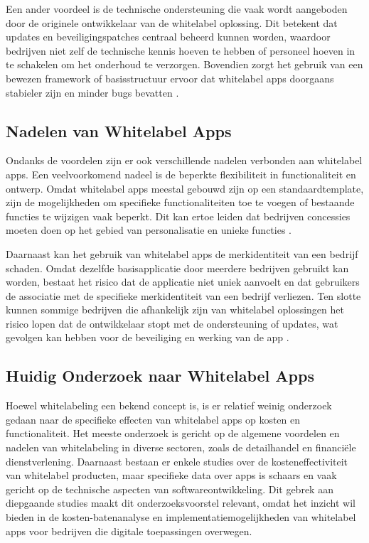 Een ander voordeel is de technische ondersteuning die vaak wordt aangeboden door de originele ontwikkelaar van de whitelabel oplossing. 
Dit betekent dat updates en beveiligingspatches centraal beheerd kunnen worden, waardoor bedrijven niet zelf de technische kennis hoeven te hebben of personeel hoeven in te schakelen om het onderhoud te verzorgen. 
Bovendien zorgt het gebruik van een bewezen framework of basisstructuur ervoor dat whitelabel apps doorgaans stabieler zijn en minder bugs bevatten \autocite{Candelario2024}.

\subsection{Nadelen van Whitelabel Apps}
Ondanks de voordelen zijn er ook verschillende nadelen verbonden aan whitelabel apps. 
Een veelvoorkomend nadeel is de beperkte flexibiliteit in functionaliteit en ontwerp. 
Omdat whitelabel apps meestal gebouwd zijn op een standaardtemplate, zijn de mogelijkheden om specifieke functionaliteiten toe te voegen of bestaande functies te wijzigen vaak beperkt. 
Dit kan ertoe leiden dat bedrijven concessies moeten doen op het gebied van personalisatie en unieke functies \autocite{Vendesta2023}.

Daarnaast kan het gebruik van whitelabel apps de merkidentiteit van een bedrijf schaden. 
Omdat dezelfde basisapplicatie door meerdere bedrijven gebruikt kan worden, bestaat het risico dat de applicatie niet uniek aanvoelt en dat gebruikers de associatie met de specifieke merkidentiteit van een bedrijf verliezen. 
Ten slotte kunnen sommige bedrijven die afhankelijk zijn van whitelabel oplossingen het risico lopen dat de ontwikkelaar stopt met de ondersteuning of updates, wat gevolgen kan hebben voor de beveiliging en werking van de app \autocite{Vendesta2023}.

\subsection{Huidig Onderzoek naar Whitelabel Apps}
Hoewel whitelabeling een bekend concept is, is er relatief weinig onderzoek gedaan naar de specifieke effecten van whitelabel apps op kosten en functionaliteit. 
Het meeste onderzoek is gericht op de algemene voordelen en nadelen van whitelabeling in diverse sectoren, zoals de detailhandel en financiële dienstverlening. 
Daarnaast bestaan er enkele studies over de kosteneffectiviteit van whitelabel producten, maar specifieke data over apps is schaars en vaak gericht op de technische aspecten van softwareontwikkeling. 
Dit gebrek aan diepgaande studies maakt dit onderzoeksvoorstel relevant, omdat het inzicht wil bieden in de kosten-batenanalyse en implementatiemogelijkheden van whitelabel apps voor bedrijven die digitale toepassingen overwegen.

